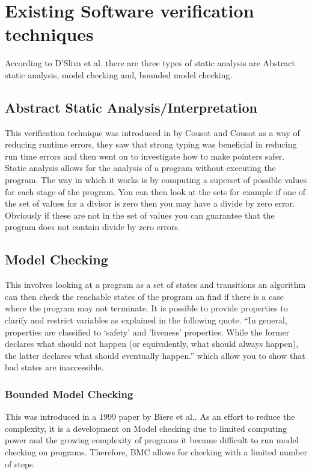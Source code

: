 \documentclass[a4paper,12pt]{scrartcl}
\begin{document}
	\section{Existing Software verification techniques}
	{
		According to D'Sliva et al. there are three types of static analysis are Abstract static analysis, model checking and, bounded model checking\cite{DSilva2008}. 
		\subsection{Abstract Static Analysis/Interpretation}
		{
			This verification technique was introduced in \cite{Cousot1977} by Cousot and Cousot as a way of reducing runtime errors, they saw that strong typing was beneficial in reducing run time errors and then went on to investigate how to make pointers safer. Static analysis allows for the analysis of a program without executing the program. The way in which it works is by computing a superset of possible values for each stage of the program. You can then look at the sets for example if one of the set of values for a divisor is zero then you may have a divide by zero error. Obviously if these are not in the set of values you can guarantee that the program does not contain divide by zero errors.
		}
		\subsection{Model Checking}
		{
			This involves looking at a program as a set of states and transitions an algorithm can then check the reachable states of the program an find if there is a case where the program may not terminate\cite{DSilva2008}. It is possible to provide properties to clarify and restrict variables as explained in the following quote. \enquote{In general, properties are classified to ‘safety’ and ’liveness’ properties. While the former declares what should not happen (or equivalently, what should always happen), the latter declares what should eventually happen.}\cite{Biere2003} which allow you to show that bad states are inaccessible.
			\subsubsection{Bounded Model Checking}
			{
				This was introduced in a 1999 paper by Biere et al.\cite{Biere1999}. As an effort to reduce the complexity, it is a development on Model checking due to limited computing power and the growing complexity of programs it became difficult to run model checking on programs. Therefore, BMC allows for checking with a limited number of steps.
			}
		}
		
	}
\end{document}
